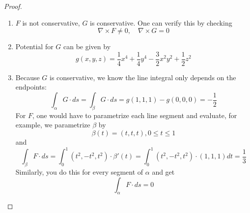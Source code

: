 \documentclass[openany]{book}
\begin{document}
\begin{proof}
    \begin{enumerate}
        \item[(a)] $F$ is not conservative, $G$ is conservative. One can verify this by checking
        \begin{equation*}
            \nabla\times F\neq 0, \quad \nabla\times G=0
        \end{equation*}
        \item[(b)] Potential for $G$ can be given by 
        \begin{equation*}
            g(x,y,z)=\frac{1}{4}x^4+\frac{1}{4}y^4-\frac{3}{2}x^2y^2+\frac{1}{2}z^2
        \end{equation*}
        \item[(c)] Because $G$ is conservative, we know the line integral only depends on the endpoints: 
        \begin{equation*}
            \int_\alpha G\cdot ds=\int_\beta G\cdot ds=g(1,1,1)-g(0,0,0)=-\frac{1}{2}
        \end{equation*}
        For $F$, one would have to parametrize each line segment and evaluate, for example, we parametrize $\beta$ by 
        \begin{equation*}
            \beta(t)=(t,t,t), 0\leq t\leq 1
        \end{equation*}
        and 
        \begin{equation*}
            \int_\beta F\cdot ds=\int_0^1(t^2, -t^2, t^2)\cdot \beta'(t)=\int_0^1(t^2, -t^2, t^2)\cdot(1,1,1)dt=\frac{1}{3}
        \end{equation*}
        Similarly, you do this for every segment of $\alpha$ and get 
        \begin{equation*}
            \int_\alpha F\cdot ds=0
        \end{equation*}
    \end{enumerate}
\end{proof}
\end{document}
